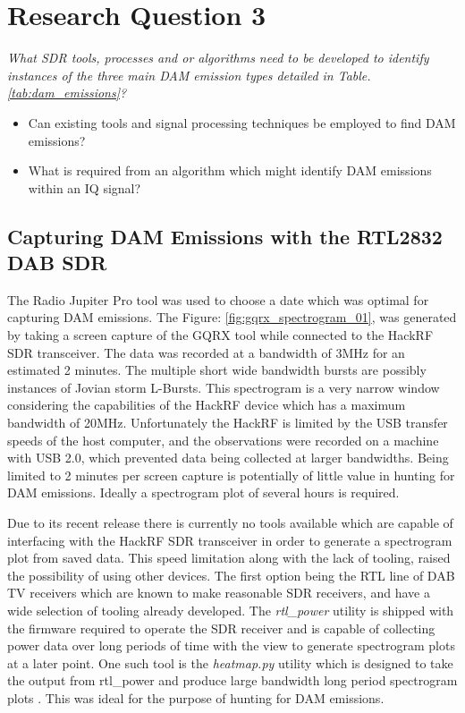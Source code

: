 \documentclass[runningheads,a4paper]{llncs}
\begin{document}
\chapter*{Research Question 3}


\textit{What \gls{SDR} tools, processes and or algorithms need to be developed to identify instances of the three main \gls{DAM} emission types detailed in Table. \ref{tab:dam_emissions}?}

\begin{itemize}
	\item Can existing tools and signal processing techniques be employed to find \gls{DAM} emissions?
	\item What is required from an algorithm which might identify \gls{DAM} emissions within an \gls{IQ} signal?
\end{itemize}

\section*{Capturing DAM Emissions with the RTL2832 DAB SDR}

The Radio Jupiter Pro tool was used to choose a date which was optimal for capturing \gls{DAM} emissions. The Figure: \ref{fig:gqrx_spectrogram_01}, was generated by taking a screen capture of the GQRX tool while connected to the HackRF \gls{SDR} transceiver. The data was recorded at a bandwidth of 3MHz for an estimated 2 minutes. The multiple short wide bandwidth bursts are possibly instances of Jovian storm L-Bursts. This spectrogram is a very narrow window considering the capabilities of the HackRF device which has a maximum bandwidth of 20MHz. Unfortunately the HackRF is limited by the USB transfer speeds of the host computer, and the observations were recorded on a machine with USB 2.0, which prevented data being collected at larger bandwidths. Being limited to 2 minutes per screen capture is potentially of little value in hunting for \gls{DAM} emissions. Ideally a spectrogram plot of several hours is required.

Due to its recent release there is currently no tools available which are capable of interfacing with the HackRF \gls{SDR} transceiver in order to generate a spectrogram plot from saved data. This speed limitation along with the lack of tooling, raised the possibility of using other devices. The first option being the RTL line of DAB TV receivers which are known to make reasonable \gls{SDR} receivers, and have a wide selection of tooling already developed. The \textit{rtl\_power} utility is shipped with the firmware required to operate the \gls{SDR} receiver and is capable of collecting power data over long periods of time with the view to generate spectrogram plots at a later point. One such tool is the \textit{heatmap.py} utility which is designed to take the output from rtl\_power and produce large bandwidth long period spectrogram plots \citep{keen-15}. This was ideal for the purpose of hunting for \gls{DAM} emissions.
\end{document}
